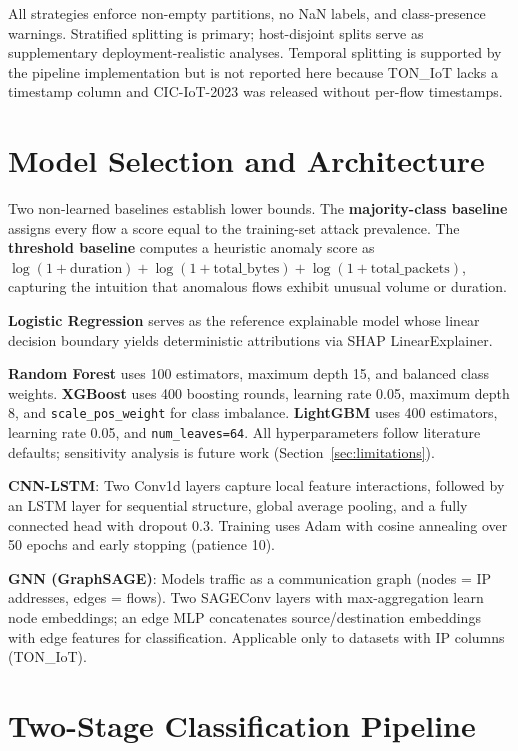 \documentclass[12pt,a4paper]{report}
\begin{document}
All strategies enforce non-empty partitions, no NaN labels, and class-presence warnings. Stratified splitting is primary; host-disjoint splits serve as supplementary deployment-realistic analyses. Temporal splitting is supported by the pipeline implementation but is not reported here because TON\_IoT lacks a timestamp column and CIC-IoT-2023 was released without per-flow timestamps.

\section{Model Selection and Architecture}
\label{sec:models}

Two non-learned baselines establish lower bounds. The \textbf{majority-class baseline} assigns every flow a score equal to the training-set attack prevalence. The \textbf{threshold baseline} computes a heuristic anomaly score as $\log(1 + \text{duration}) + \log(1 + \text{total\_bytes}) + \log(1 + \text{total\_packets})$, capturing the intuition that anomalous flows exhibit unusual volume or duration.

\textbf{Logistic Regression} serves as the reference explainable model whose linear decision boundary yields deterministic attributions via SHAP LinearExplainer.

\textbf{Random Forest} uses 100 estimators, maximum depth 15, and balanced class weights. \textbf{XGBoost} uses 400 boosting rounds, learning rate 0.05, maximum depth 8, and \texttt{scale\_pos\_weight} for class imbalance. \textbf{LightGBM} uses 400 estimators, learning rate 0.05, and \texttt{num\_leaves=64}. All hyperparameters follow literature defaults; sensitivity analysis is future work (Section~\ref{sec:limitations}).

\textbf{CNN-LSTM}: Two Conv1d layers capture local feature interactions, followed by an LSTM layer for sequential structure, global average pooling, and a fully connected head with dropout 0.3. Training uses Adam with cosine annealing over 50 epochs and early stopping (patience 10).

\textbf{GNN (GraphSAGE)}: Models traffic as a communication graph (nodes = IP addresses, edges = flows). Two SAGEConv layers with max-aggregation learn node embeddings; an edge MLP concatenates source/destination embeddings with edge features for classification. Applicable only to datasets with IP columns (TON\_IoT).

\section{Two-Stage Classification Pipeline}
\label{sec:two-stage}
\end{document}
